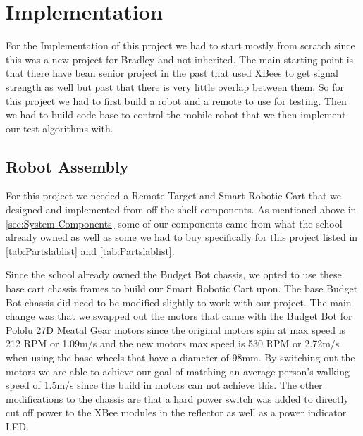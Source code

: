 \chapter{Implementation}
\label{ch: Chapter5}

For the Implementation of this project we had to start mostly from scratch since this was a new project for Bradley and not inherited.  The main starting point is that there have bean senior project in the past that used XBees to get signal strength as well but past that there is very little overlap between them. So for this project we had to first build a robot and a remote to use for testing. Then we had to build code base to control the mobile robot that we then implement our test algorithms with.

\section{Robot Assembly}
\label{sec:Robot Assembly}

For this project we needed a Remote Target and Smart Robotic Cart that we designed and implemented from off the shelf components.  As mentioned above in \autoref{sec:System Components} some of our components came from what the school already owned as well as some we had to buy specifically for this project listed in \autoref{tab:Partslablist} and \autoref{tab:Partslablist}.\par
Since the school already owned the Budget Bot chassis, we opted to use these base cart chassis frames to build our Smart Robotic Cart upon.  The base Budget Bot chassis did need to be modified slightly to work with our project.  The main change was that we swapped out the motors that came with the Budget Bot for Pololu 27D Meatal Gear motors since the original motors spin at max speed is 212 RPM or 1.09m/s and the new motors max speed is 530 RPM or 2.72m/s when using the base wheels that have a diameter of 98mm.  By switching out the motors we are able to achieve our goal of  matching an average person's walking speed of 1.5m/s since the build in motors can not achieve this. The other modifications to the chassis are that a hard power switch was added to directly cut off power to the XBee modules in the reflector as well as a power indicator LED. \par

